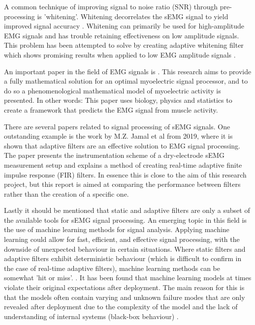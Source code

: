 A common technique of improving signal to noise ratio (SNR) through pre-processing is 'whitening'. Whitening decorrelates the sEMG signal to yield improved signal accuracy \cite{emg_whitening}. 
Whitening can primarily be used for high-amplitude EMG signals and has trouble retaining effectiveness on low amplitude signals. This problem has been attempted to solve by creating adaptive whitening filter which shows promising results when applied to low EMG amplitude signals \cite{adaptive_whitening}. 

An important paper in the field of EMG signals is \cite{optimal_myoprocessor}. This research aims to provide a fully mathematical solution for an optimal myoelectric signal processor, and to do so a phenomenological mathematical model of myoelectric activity is presented. In other words: This paper uses biology, physics and statistics to create a framework that predicts the EMG signal from muscle activity.

There are several papers related to signal processing of sEMG signals.
One outstanding example is the work by M.Z. Jamal et al \cite{adaptive_filter_dry_electrode} from 2019, where it is shown that adaptive filters are an effective solution to EMG signal processing. The paper presents the instrumentation scheme of a dry-electrode sEMG measurement setup and explains a method of creating real-time adaptive finite impulse response (FIR) filters. In essence this is close to the aim of this research project, but this report is aimed at comparing the performance between filters rather than the creation of a specific one.


Lastly it should be mentioned that static and adaptive filters are only a subset of the available tools for sEMG signal processing. An emerging topic in this field is the use of machine learning methods for signal analysis. Applying machine learning could allow for fast, efficient, and effective signal processing, with the downside of unexpected behaviour in certain situations. Where static filters and adaptive filters exhibit deterministic behaviour (which is difficult to confirm in the case of real-time adaptive filters), machine learning methods can be somewhat 'hit or miss'. \cite{ml_semg_processing_1,ml_semg_processing_2}. It has been found that machine learning models at times violate their original expectations after deployment. The main reason for this is that the models often contain varying and unknown failure modes that are only revealed after deployment due to the complexity of the model and the lack of understanding of internal systems (black-box behaviour) \cite{microsoft_machine_learning_reliable}.

